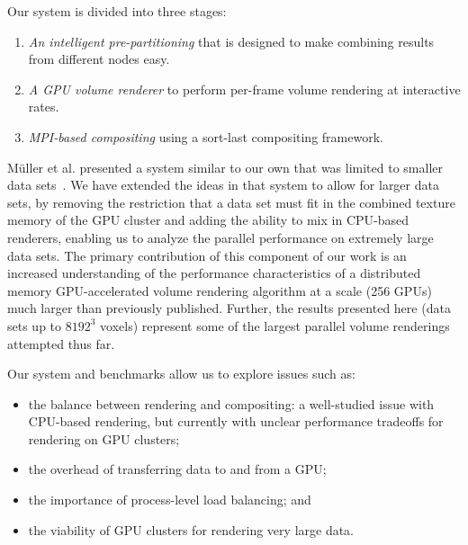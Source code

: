 Our system is divided into three stages:

\begin{enumerate}

  \item \emph{An intelligent pre-partitioning} that is designed to make
  combining results from different nodes easy.

  \item \emph{A GPU volume renderer} to perform per-frame volume
  rendering at interactive rates.

  \item \emph{MPI-based compositing} using a sort-last compositing framework.

\end{enumerate}

M\"uller et al. presented a system similar to our own that was limited
to smaller data sets~\cite{Mueller:2006:ParallelVRen}.  We have
extended the ideas in that system to allow for larger data sets, by
removing the restriction that a data set must fit in the combined
texture memory of the GPU cluster and adding the ability to mix in
CPU-based renderers, enabling us to analyze the parallel performance
on extremely large data sets.  The primary contribution of this
component of our work is an increased understanding of the performance
characteristics of a distributed memory GPU-accelerated volume
rendering algorithm at a scale (256 GPUs) much larger than previously
published.  Further, the results presented here (data sets up to
$8192^3$ voxels) represent some of the largest parallel volume
renderings attempted thus far.

Our system and benchmarks allow us to explore issues such as:

\begin{itemize}

  \item the balance between rendering and compositing: a well-studied
  issue with CPU-based rendering, but currently with unclear
  performance tradeoffs for rendering on GPU clusters;

  \item the overhead of transferring data to and from a GPU;

  \item the importance of process-level load balancing; and

  \item the viability of GPU clusters for rendering very large data.

\end{itemize}

